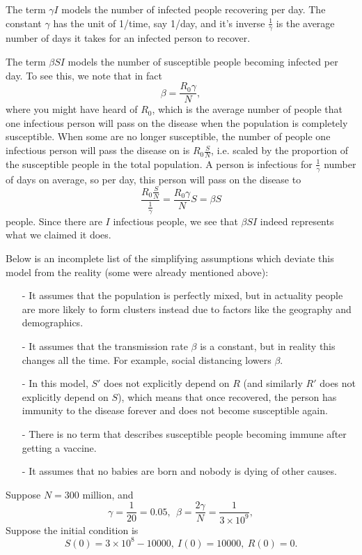 \documentclass[11pt]{article}
\theoremstyle{definition}
\begin{document}
\begin{enumerate}[leftmargin=*]
 The term $\gamma I$ models the number of  infected people recovering per day.  The constant $\gamma$ has the unit of 1/time, say 1/day, and it's inverse $\frac{1}{\gamma}$ is the average number of days it takes for an infected person to recover. 

The term $\beta SI$ models the number of susceptible people becoming infected per day.  To see this, we note that in fact
\[
\beta=\frac{R_0\gamma}{N},
\] 
where you might have heard of $R_0$, which is the average number of people that one infectious person will pass on the disease when the population is completely susceptible.  When some are no longer susceptible, the number of people one infectious person will pass the disease on is $R_0\frac{S}{N}$, i.e. scaled by the proportion of the susceptible people in the total population.  A person is infectious for $\frac{1}{\gamma}$ number of days on average, so  per day, this person will pass on the disease to 
\[
\frac{R_0\frac{S}{N}}{\frac{1}{\gamma}}=\frac{R_0\gamma}{N}S=\beta S
\] people.  Since there are $I$ infectious people, we see that $\beta SI$ indeed represents what we claimed it does.


Below is an incomplete list of the simplifying assumptions which deviate this model from the reality (some were already mentioned above):
\begin{itemize}
\item[-] It assumes that the population is perfectly mixed, but in actuality people are more likely to form clusters instead due to factors like the geography and demographics.   

\item [-]It assumes that the transmission rate $\beta$ is a constant, but in reality this changes all the time.  For example, social distancing lowers $\beta$.  

\item [-] In this model, $S'$ does not explicitly depend on  $R$ (and similarly $R'$ does not explicitly depend on $S$), which means that once recovered, the person has immunity to the disease forever and does not become susceptible again.  

\item [-] There is no term that describes susceptible people becoming immune after getting a vaccine.  
\item [-] It assumes that no babies are born and nobody is dying of other causes.
\end{itemize}

Suppose $N=300$ million, and
\[
\gamma=\frac{1}{20}=0.05, \ \  \beta=\frac{2\gamma}{N} =\frac{1}{3 \times 10^9},
\]
Suppose the initial condition is
\[ 
S(0)=3\times 10^8-10000, \ I(0)=10000, \ R(0)=0.
\]


\end{enumerate}
\end{document}
